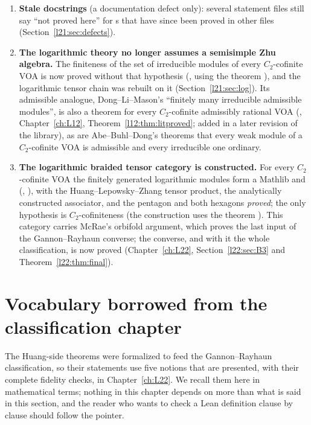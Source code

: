 \begin{enumerate}
\item \textbf{Stale docstrings} (a documentation defect only): several statement files still say ``not proved here'' for s that have
  since been proved in other files (Section~\ref{l21:sec:defects}).
\item \textbf{The logarithmic theory no longer assumes a semisimple Zhu algebra.} The finiteness of the set of
  irreducible modules of every $C_2$-cofinite VOA is now proved without that hypothesis
  (, using the theorem ), and the logarithmic tensor chain was rebuilt on it
  (Section~\ref{l21:sec:log}). Its admissible analogue, Dong--Li--Mason's ``finitely many irreducible admissible modules'', is
  also a theorem for every $C_2$-cofinite admissibly rational VOA (,
  Chapter~\ref{ch:L12}, Theorem~\ref{l12:thm:litproved}; added in a later revision of the library), as are Abe--Buhl--Dong's theorems that
  every weak module of a $C_2$-cofinite VOA is admissible and every irreducible one ordinary.
\item \textbf{The logarithmic braided tensor category is constructed.} For every $C_2$-cofinite VOA the finitely
  generated logarithmic modules form a Mathlib  and 
  (, ), with the Huang--Lepowsky--Zhang tensor
  product, the analytically constructed associator, and the pentagon and both hexagons \emph{proved}; the only
  hypothesis is $C_2$-cofiniteness (the construction uses the theorem ). This category carries McRae's orbifold argument, which
  proves the last input of the Gannon--Rayhaun converse; the converse, and with it the whole classification, is now proved
  (Chapter~\ref{ch:L22}, Section~\ref{l22:sec:B3} and Theorem~\ref{l22:thm:final}).
\end{enumerate}

\section{Vocabulary borrowed from the classification chapter}\label{l21:sec:vocab}

The Huang-side theorems were formalized to feed the Gannon--Rayhaun classification, so their statements use five
notions that are presented, with their complete fidelity checks, in Chapter~\ref{ch:L22}. We recall them here in
mathematical terms; nothing in this chapter depends on more than what is said in this section, and the reader who
wants to check a Lean definition clause by clause should follow the pointer.

